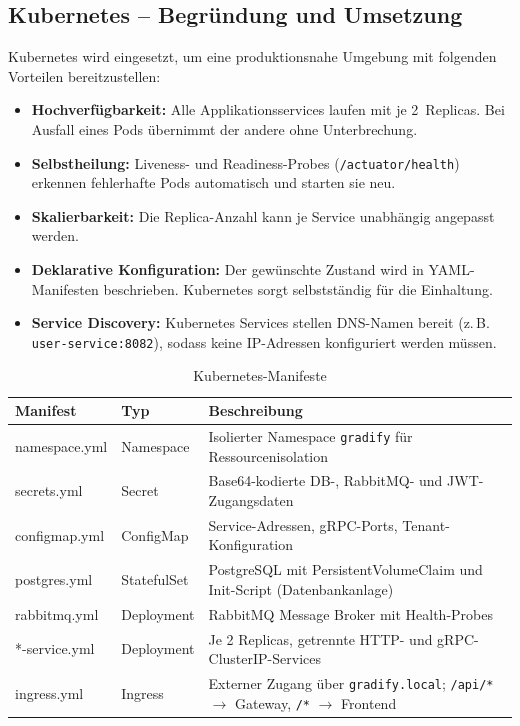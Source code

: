 \documentclass[12pt,a4paper,ngerman]{article}
\begin{document}
\subsection{Kubernetes -- Begründung und Umsetzung}

Kubernetes wird eingesetzt, um eine produktionsnahe Umgebung mit folgenden Vorteilen bereitzustellen:

\begin{itemize}[nosep]
\item \textbf{Hochverfügbarkeit:} Alle Applikationsservices laufen mit je 2~Replicas. Bei Ausfall eines Pods übernimmt der andere ohne Unterbrechung.
\item \textbf{Selbstheilung:} Liveness- und Readiness-Probes (\texttt{/actuator/health}) erkennen fehlerhafte Pods automatisch und starten sie neu.
\item \textbf{Skalierbarkeit:} Die Replica-Anzahl kann je Service unabhängig angepasst werden.
\item \textbf{Deklarative Konfiguration:} Der gewünschte Zustand wird in YAML-Manifesten beschrieben. Kubernetes sorgt selbstständig für die Einhaltung.
\item \textbf{Service Discovery:} Kubernetes Services stellen DNS-Namen bereit (z.\,B. \texttt{user-service:8082}), sodass keine IP-Adressen konfiguriert werden müssen.
\end{itemize}

\begin{table}[H]
\centering
\caption{Kubernetes-Manifeste}
\begin{tabular}{llL{6.5cm}}
\toprule
\textbf{Manifest} & \textbf{Typ} & \textbf{Beschreibung} \\
\midrule
namespace.yml    & Namespace    & Isolierter Namespace \texttt{gradify} für Ressourcenisolation \\
secrets.yml      & Secret       & Base64-kodierte DB-, RabbitMQ- und JWT-Zugangsdaten \\
configmap.yml    & ConfigMap    & Service-Adressen, gRPC-Ports, Tenant-Konfiguration \\
postgres.yml     & StatefulSet  & PostgreSQL mit PersistentVolumeClaim und Init-Script (Datenbankanlage) \\
rabbitmq.yml     & Deployment   & RabbitMQ Message Broker mit Health-Probes \\
*-service.yml    & Deployment   & Je 2 Replicas, getrennte HTTP- und gRPC-ClusterIP-Services \\
ingress.yml      & Ingress      & Externer Zugang über \texttt{gradify.local}; \texttt{/api/*} $\rightarrow$ Gateway, \texttt{/*} $\rightarrow$ Frontend \\
\bottomrule
\end{tabular}
\end{table}
\end{document}
